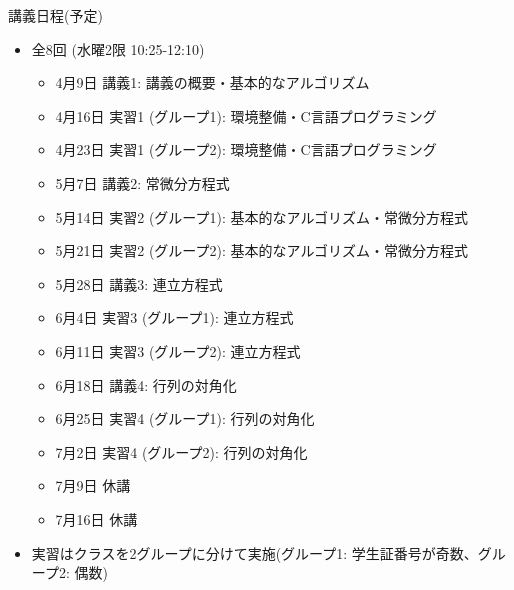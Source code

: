\begin{frame}[t]{講義日程(予定)}
  \begin{itemize}
  \item 全8回 (水曜2限 10:25-12:10)
    \begin{itemize}
    \item 4月9日 講義1: 講義の概要・基本的なアルゴリズム
    \item 4月16日 実習1 (グループ1): 環境整備・C言語プログラミング
    \item 4月23日 実習1 (グループ2): 環境整備・C言語プログラミング
    \item 5月7日 講義2: 常微分方程式
    \item 5月14日 実習2 (グループ1): 基本的なアルゴリズム・常微分方程式
    \item 5月21日 実習2 (グループ2): 基本的なアルゴリズム・常微分方程式
    \item 5月28日 講義3: 連立方程式
    \item 6月4日 実習3 (グループ1): 連立方程式
    \item 6月11日 実習3 (グループ2): 連立方程式
    \item 6月18日 講義4: 行列の対角化
    \item 6月25日 実習4 (グループ1): 行列の対角化
    \item 7月2日 実習4 (グループ2): 行列の対角化
    \item {\color{gray} 7月9日 休講}
    \item {\color{gray} 7月16日 休講}
    \end{itemize}
  \item 実習はクラスを2グループに分けて実施(グループ1: 学生証番号が奇数、グループ2: 偶数)
  \end{itemize}
\end{frame}

